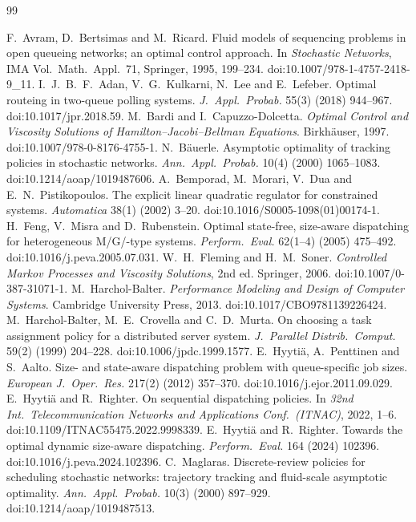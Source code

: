 \documentclass[11pt]{article}
\numberwithin{equation}{section}
\theoremstyle{definition}
\theoremstyle{remark}
\begin{document}
\begin{thebibliography}{99}\small\raggedright
{} F.~Avram, D.~Bertsimas and M.~Ricard. Fluid models of sequencing problems in open queueing networks; an optimal control approach. In \emph{Stochastic Networks}, IMA Vol.\ Math.\ Appl.\ 71, Springer, 1995, 199--234. doi:10.1007/978-1-4757-2418-9\_11.
 I.~J.~B.~F.~Adan, V.~G.~Kulkarni, N.~Lee and E.~Lefeber. Optimal routeing in two-queue polling systems. \emph{J.\ Appl.\ Probab.} 55(3) (2018) 944--967. doi:10.1017/jpr.2018.59.
 M.~Bardi and I.~Capuzzo-Dolcetta. \emph{Optimal Control and Viscosity Solutions of Hamilton--Jacobi--Bellman Equations}. Birkh\"auser, 1997. doi:10.1007/978-0-8176-4755-1.
 N.~B\"auerle. Asymptotic optimality of tracking policies in stochastic networks. \emph{Ann.\ Appl.\ Probab.} 10(4) (2000) 1065--1083. doi:10.1214/aoap/1019487606.
 A.~Bemporad, M.~Morari, V.~Dua and E.~N.~Pistikopoulos. The explicit linear quadratic regulator for constrained systems. \emph{Automatica} 38(1) (2002) 3--20. doi:10.1016/S0005-1098(01)00174-1.
 H.~Feng, V.~Misra and D.~Rubenstein. Optimal state-free, size-aware dispatching for heterogeneous M/G/-type systems. \emph{Perform.\ Eval.} 62(1--4) (2005) 475--492. doi:10.1016/j.peva.2005.07.031.
 W.~H.~Fleming and H.~M.~Soner. \emph{Controlled Markov Processes and Viscosity Solutions}, 2nd ed. Springer, 2006. doi:10.1007/0-387-31071-1.
 M.~Harchol-Balter. \emph{Performance Modeling and Design of Computer Systems}. Cambridge University Press, 2013. doi:10.1017/CBO9781139226424.
 M.~Harchol-Balter, M.~E.~Crovella and C.~D.~Murta. On choosing a task assignment policy for a distributed server system. \emph{J.\ Parallel Distrib.\ Comput.} 59(2) (1999) 204--228. doi:10.1006/jpdc.1999.1577.
 E.~Hyyti\"a, A.~Penttinen and S.~Aalto. Size- and state-aware dispatching problem with queue-specific job sizes. \emph{European J.\ Oper.\ Res.} 217(2) (2012) 357--370. doi:10.1016/j.ejor.2011.09.029.
 E.~Hyyti\"a and R.~Righter. On sequential dispatching policies. In \emph{32nd Int.\ Telecommunication Networks and Applications Conf.\ (ITNAC)}, 2022, 1--6. doi:10.1109/ITNAC55475.2022.9998339.
 E.~Hyyti\"a and R.~Righter. Towards the optimal dynamic size-aware dispatching. \emph{Perform.\ Eval.} 164 (2024) 102396. doi:10.1016/j.peva.2024.102396.
 C.~Maglaras. Discrete-review policies for scheduling stochastic networks: trajectory tracking and fluid-scale asymptotic optimality. \emph{Ann.\ Appl.\ Probab.} 10(3) (2000) 897--929. doi:10.1214/aoap/1019487513.

\end{thebibliography}
\end{document}
